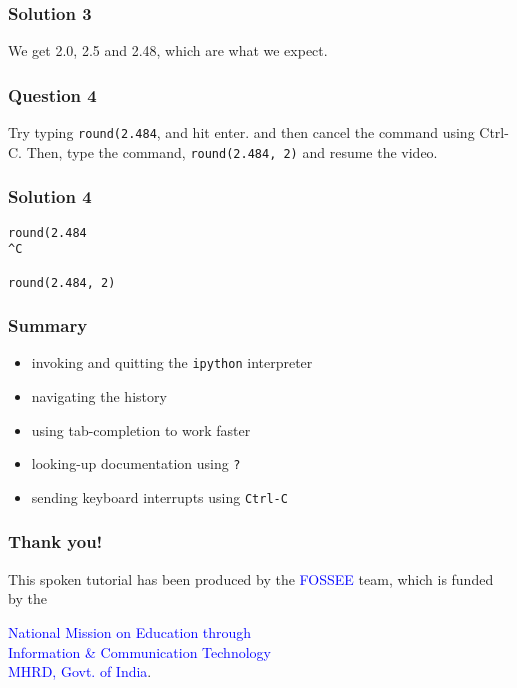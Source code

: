 \documentclass[presentation]{beamer}
\begin{document}
\begin{frame}
\frametitle{Solution 3}
\label{sec-7}

  We get 2.0, 2.5 and 2.48, which are what we expect. 
\end{frame}
\begin{frame}
\frametitle{Question 4}
\label{sec-8}

  Try typing \texttt{round(2.484}, and hit enter. and then cancel the command
  using Ctrl-C. Then, type the command, \texttt{round(2.484, 2)} and resume
  the video.
\end{frame}
\begin{frame}[fragile]
\frametitle{Solution 4}
\label{sec-9}

\lstset{language=Python}
\begin{lstlisting}
round(2.484 
^C

round(2.484, 2)
\end{lstlisting}
\end{frame}
\begin{frame}
\frametitle{Summary}
\label{sec-10}

\begin{itemize}
\item invoking and quitting the \texttt{ipython} interpreter
\item navigating the history
\item using tab-completion to work faster
\item looking-up documentation using \texttt{?}
\item sending keyboard interrupts using \texttt{Ctrl-C}
\end{itemize}
\end{frame}
\begin{frame}
\frametitle{Thank you!}
\label{sec-11}

  \begin{block}{}
  \begin{center}
  This spoken tutorial has been produced by the
  \textcolor{blue}{FOSSEE} team, which is funded by the 
  \end{center}
  \begin{center}
    \textcolor{blue}{National Mission on Education through \\
      Information \& Communication Technology \\ 
      MHRD, Govt. of India}.
  \end{center}  
  \end{block}
\end{frame}
\end{document}

